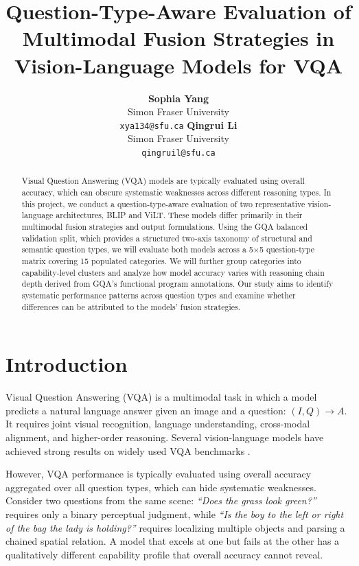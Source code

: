 \documentclass[11pt]{article}
\title{Question-Type-Aware Evaluation of Multimodal Fusion Strategies in Vision-Language Models for VQA}
\author{
  \textbf{Sophia Yang} \\
  Simon Fraser University \\
  \texttt{xya134@sfu.ca}
  \And
  \textbf{Qingrui Li} \\
  Simon Fraser University\\
  \texttt{qingruil@sfu.ca}
}
\begin{document}
\maketitle

\begin{abstract}
Visual Question Answering (VQA) models are typically evaluated using overall accuracy, which can obscure systematic weaknesses across different reasoning types. In this project, we conduct a question-type-aware evaluation of two representative vision-language architectures, BLIP and ViLT. These models differ primarily in their multimodal fusion strategies and output formulations. Using the GQA balanced validation split, which provides a structured two-axis taxonomy of structural and semantic question types, we will evaluate both models across a 5$\times$5 question-type matrix covering 15 populated categories. We will further group categories into capability-level clusters and analyze how model accuracy varies with reasoning chain depth derived from GQA's functional program annotations. Our study aims to identify systematic performance patterns across question types and examine whether differences can be attributed to the models' fusion strategies.
\end{abstract}

\section{Introduction}
Visual Question Answering (VQA) is a multimodal task in which a model predicts a natural language answer given an image and a question: $(I, Q) \rightarrow A$. It requires joint visual recognition, language understanding, cross-modal alignment, and higher-order reasoning. Several vision-language models have achieved strong results on widely used VQA benchmarks \cite{tan2019lxmert, lu2019vilbert, kim2021vilt, li2022blip}.

However, VQA performance is typically evaluated using overall accuracy aggregated over all question types, which can hide systematic weaknesses. Consider two questions from the same scene: \emph{``Does the grass look green?''} requires only a binary perceptual judgment, while \emph{``Is the boy to the left or right of the bag the lady is holding?''} requires localizing multiple objects and parsing a chained spatial relation. A model that excels at one but fails at the other has a qualitatively different capability profile that overall accuracy cannot reveal.
\end{document}
